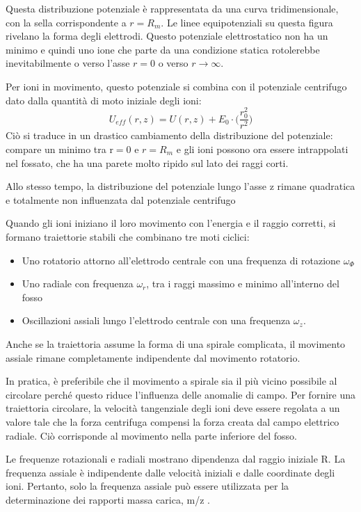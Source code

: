 Questa distribuzione potenziale è rappresentata da una curva tridimensionale, con la sella corrispondente a $r = R_m$.
Le linee equipotenziali su questa figura rivelano la forma degli elettrodi.
Questo potenziale elettrostatico non ha un minimo e quindi uno ione che parte da una condizione statica rotolerebbe inevitabilmente o verso l'asse $r = 0$ o verso $r \to \infty$.

Per ioni in movimento, questo potenziale si combina con il potenziale centrifugo dato dalla quantità di moto iniziale degli ioni:
\[
U_{eff} (r,z) = U (r,z) + E_0 \cdot \biggl(\frac{r_0^2}{r^2}\biggr)
\]
Ciò si traduce in un drastico cambiamento della distribuzione del potenziale: compare un minimo tra r$ = 0$ e $r = R_m$ e gli ioni possono ora essere intrappolati nel fossato, che ha una parete molto ripido sul lato dei raggi
corti.

Allo stesso tempo, la distribuzione del potenziale lungo l'asse z rimane quadratica e totalmente non influenzata dal potenziale centrifugo

Quando gli ioni iniziano il loro movimento con l'energia e il raggio corretti, si formano traiettorie stabili che
combinano tre moti ciclici:
\begin{itemize}
\item Uno rotatorio attorno all'elettrodo centrale con una frequenza di rotazione $\omega_\Phi$
\item Uno radiale con frequenza $\omega_r$, tra i raggi massimo e minimo all'interno del fosso
\item Oscillazioni assiali lungo l'elettrodo centrale con una frequenza $\omega_z$.
\end{itemize}

Anche se la traiettoria assume la forma di una spirale complicata, il movimento assiale rimane completamente indipendente dal movimento rotatorio.

In pratica, è preferibile che il movimento a spirale sia il più vicino possibile al circolare perché questo riduce l'influenza delle anomalie di campo.
Per fornire una traiettoria circolare, la velocità tangenziale degli ioni deve essere regolata a un valore tale che la forza centrifuga compensi la forza creata dal campo elettrico radiale.
Ciò corrisponde al movimento nella parte inferiore del fosso.


Le frequenze rotazionali e radiali mostrano dipendenza dal raggio iniziale R.
La frequenza assiale è indipendente dalle velocità iniziali e dalle coordinate degli ioni.
Pertanto, solo la frequenza assiale può essere utilizzata per la determinazione dei rapporti massa carica, m/z .

